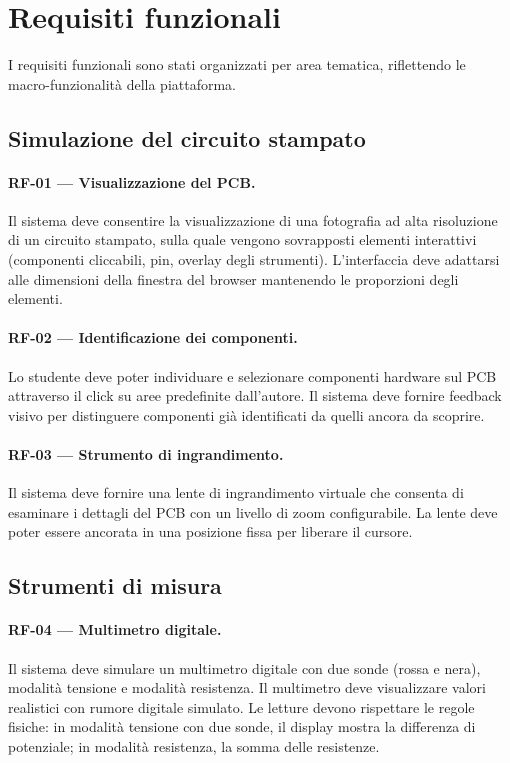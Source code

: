 \section{Requisiti funzionali}
\label{sec:requisiti-funzionali}

I requisiti funzionali sono stati organizzati per area tematica, riflettendo le macro-funzionalità della piattaforma.

\subsection{Simulazione del circuito stampato}
\label{subsec:rf-simulazione-pcb}

\paragraph{RF-01 --- Visualizzazione del PCB.} Il sistema deve consentire la visualizzazione di una fotografia ad alta risoluzione di un circuito stampato, sulla quale vengono sovrapposti elementi interattivi (componenti cliccabili, pin, overlay degli strumenti). L'interfaccia deve adattarsi alle dimensioni della finestra del browser mantenendo le proporzioni degli elementi.

\paragraph{RF-02 --- Identificazione dei componenti.} Lo studente deve poter individuare e selezionare componenti hardware sul PCB attraverso il click su aree predefinite dall'autore. Il sistema deve fornire feedback visivo per distinguere componenti già identificati da quelli ancora da scoprire.

\paragraph{RF-03 --- Strumento di ingrandimento.} Il sistema deve fornire una lente di ingrandimento virtuale che consenta di esaminare i dettagli del PCB con un livello di zoom configurabile. La lente deve poter essere ancorata in una posizione fissa per liberare il cursore.

\subsection{Strumenti di misura}
\label{subsec:rf-strumenti-misura}

\paragraph{RF-04 --- Multimetro digitale.} Il sistema deve simulare un multimetro digitale con due sonde (rossa e nera), modalità tensione e modalità resistenza. Il multimetro deve visualizzare valori realistici con rumore digitale simulato. Le letture devono rispettare le regole fisiche: in modalità tensione con due sonde, il display mostra la differenza di potenziale; in modalità resistenza, la somma delle resistenze.


